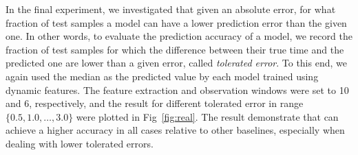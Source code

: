 In the final experiment, we investigated that given an absolute error, for what fraction of test samples a model can have a lower prediction error than the given one. In other words, to evaluate the prediction accuracy of a model, we record the fraction of test samples for which the difference between their true time and the predicted one are lower than a given error, called \emph{tolerated error}. To this end, we again used the median as the predicted value by each model trained using dynamic features. The feature extraction and observation windows were set to 10 and 6, respectively, and the result for different tolerated error in range $\{0.5, 1.0, \dots, 3.0\}$ were plotted in Fig~\ref{fig:real}. The result demonstrate that \npglm can achieve a higher accuracy in all cases relative to other baselines, especially when dealing with lower tolerated errors.